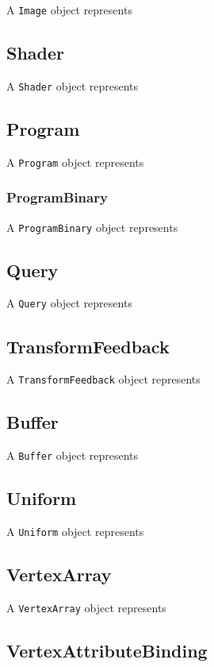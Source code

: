 \documentclass{article}
\begin{document}
A \verb|Image| object represents 

\subsection{Shader}

A \verb|Shader| object represents 

\subsection{Program}

A \verb|Program| object represents 

\subsubsection{ProgramBinary}

A \verb|ProgramBinary| object represents 

\subsection{Query}

A \verb|Query| object represents 

\subsection{TransformFeedback}

A \verb|TransformFeedback| object represents 

\subsection{Buffer}

A \verb|Buffer| object represents 

\subsection{Uniform}

A \verb|Uniform| object represents 

\subsection{VertexArray}

A \verb|VertexArray| object represents 

\subsection{VertexAttributeBinding}
\end{document}
